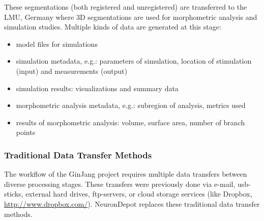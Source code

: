 \documentclass{frontiersSCNS} %
\begin{document}
These segmentations  (both registered and unregistered) are transferred to the
LMU, Germany where 3D segmentations are used for morphometric analysis and
simulation studies. Multiple kinds of data are generated at this
stage:

\begin{itemize}
\item model files for simulations
\item simulation metadata, e.g.: parameters of simulation, location of
    stimulation (input) and measurements (output)
\item simulation results: visualizations and summary data
\item morphometric analysis metadata, e.g.: subregion of analysis, metrics used
\item results of morphometric analysis: volume, surface area, number of branch points
\end{itemize}


\subsubsection{Traditional Data Transfer Methods}

The workflow of the GinJang project requires multiple data transfers between
diverse processing stages. These transfers were previously done via e-mail,
usb-sticks, external hard drives, ftp-servers, or cloud storage services (like
Dropbox, \url{http://www.dropbox.com/}). NeuronDepot replaces these traditional data transfer methods.


\end{document}
